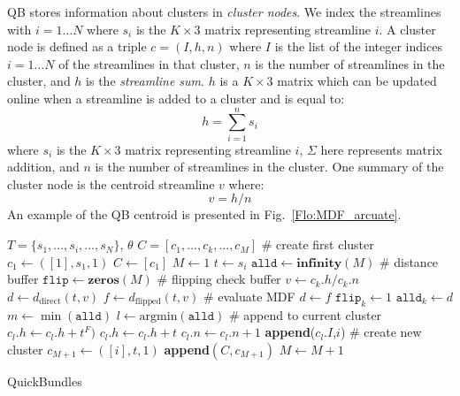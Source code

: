 \documentclass{bioinfo}
\begin{document}
\begin{methods}
QB stores information about clusters in \emph{cluster nodes}. We index
the streamlines with $i = 1 \dots N$ where $s_{i}$ is the $K\times3$
matrix representing streamline $i$.  A cluster node is defined as a
triple $c=(I,h,n)$ where $I$ is the list of the integer indices $i = 1
\dots N$ of the streamlines in that cluster, $n$ is the number of
streamlines in the cluster, and $h$ is the \emph{streamline sum}. $h$ is
a $K \times3$ matrix which can be updated online when a streamline is
added to a cluster and is equal to:
\begin{equation}
  h=\sum_{i=1}^{n}s_{i}
\end{equation} 
where $s_{i}$ is the $K\times3$ matrix representing streamline $i$,
$\Sigma$ here represents matrix addition, and $n$ is the number of
streamlines in the cluster. One summary of the cluster node is the
centroid streamline $v$ where:
\begin{equation}
  v = h / n
\end{equation}
An example of the QB centroid is presented in Fig.~\ref{Flo:MDF_arcuate}.
\begin{algorithm}[h]
\begin{algorithmic}
\REQUIRE $T=\{s_{1},...,s_{i},...,s_{N}\}$, $\theta$
\ENSURE $C=[c_{1},...,c_{k},...,c_{M}]$ 
\STATE \# create first cluster
\STATE $c_{1} \leftarrow ([1],s_{1},1)$
\STATE $C\leftarrow[c_{1}]$
\STATE $M\leftarrow1$ 
	\STATE $t\leftarrow s_{i}$
	\STATE $\texttt{alld}\leftarrow\textbf{infinity}(M)$ \# distance buffer
	\STATE $\texttt{flip}\leftarrow\textbf{zeros}(M)$ \# flipping check buffer
		\STATE $v\leftarrow c_{k}.h/c_{k}.n$
		\STATE $d\leftarrow d_{\textrm{direct}}(t,v)$
		\STATE $f\leftarrow d_{\textrm{flipped}}(t,v)$
	\STATE \# evaluate MDF
		\STATE $d \leftarrow f$
		\STATE $\texttt{flip}_{k} \leftarrow 1$
	\ENDIF
	\STATE $\texttt{alld}_{k} \leftarrow d$
	\ENDFOR
\STATE $m\leftarrow \min(\texttt{alld})$
\STATE $l\leftarrow \mathrm{arg min}(\texttt{alld})$
\STATE \# append to current cluster
		\STATE $c_{l}.h \leftarrow c_{l}.h + t^F)$
	\ELSE
		\STATE $c_{l}.h \leftarrow c_{l}.h + t$
	\ENDIF
	\STATE $c_{l}.n \leftarrow c_{l}.n + 1$
	\STATE \textbf{append}($c_{l}.I$,$i$)
\ELSE 
\STATE \# create new cluster
        \STATE $c_{M+1} \leftarrow ([i],t,1)$
        \STATE \textbf{append}$(C,c_{M+1})$
	\STATE $M\leftarrow M+1$
\ENDIF
\ENDFOR 
\end{algorithmic}
\caption{QuickBundles}
\label{Alg:QuickBundles}
\end{algorithm}


\end{methods}
\end{document}
